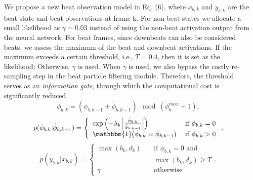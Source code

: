 \documentclass{article}
\begin{document}
We propose a new beat observation model in Eq. (6), where ${x_{b,k}}$ and ${y_{b,k}}$ are the beat state and beat observations at frame k. For non-beat states we allocate a small likelihood as $\gamma=0.03$ instead of using the non-beat activation output from the neural network. For beat frames, since downbeats can also be considered beats, we assess the maximum of the beat and downbeat activations. If the maximum exceeds a certain threshold, i.e., $T=0.4$, then it is set as the likelihood; Otherwise, $\gamma$ is used. When $\gamma$ is used, we also bypass the costly re-sampling step in the beat particle filtering module. Therefore, the threshold serves as an \emph{information gate}, through which the computational cost is significantly reduced. \begin{equation}
\phi_{b,k} = (\phi_{b,k-1} + \dot{\phi}_{b,k-1}) \mod (\phi_b^{max}+1),
\end{equation}
\begin{equation}
    p(\dot{\phi}_{b,k} | \dot{\phi}_{b,k-1}) =
      \left\{
        \begin{array}{ll}
            \exp{\left(-\lambda_{b} \left| \frac{\dot{\phi}_{b,k}}{\dot{\phi}_{b,k-1}} \right|\right)} & \hspace{0.25em} \text{if } \phi_{b,k}=0\\
            \mathbbm{1}(\dot{\phi}_{b,k} = \dot{\phi}_{b,k-1}) & \hspace{0.25em} \text{if } \phi_{b,k}>0 
        \end{array}
      \right. ,
\end{equation}
\begin{equation}
    p(y_{b,k} | x_{b,k}) =
      \left\{
        \begin{array}{ll}
            \max(b_k, d_k) & \quad \text{if } \phi_{b,k}=0\text{ and} \\
            {} & \quad \max(b_k, d_k) \geq T \\
            \gamma & \quad \text{otherwise}
        \end{array}
      \right. ,
\end{equation}
\end{document}
